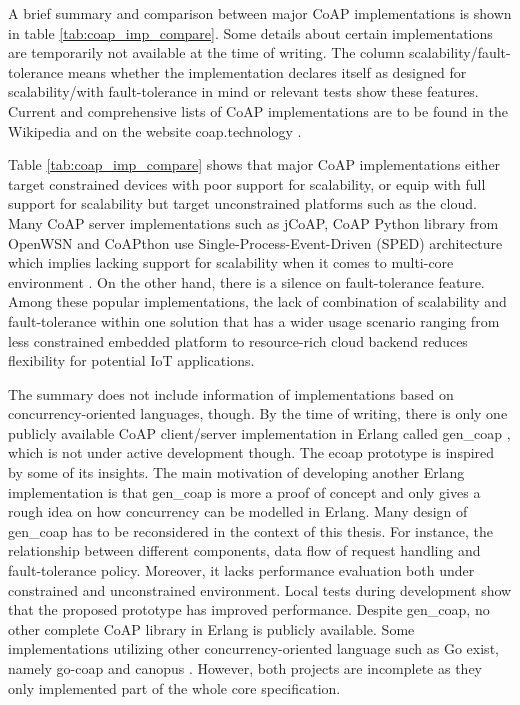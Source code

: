 A brief summary and comparison between major CoAP implementations is shown in table \ref{tab:coap_imp_compare}. Some details about certain implementations are temporarily not available at the time of writing. The column scalability/fault-tolerance means whether the implementation declares itself as designed for scalability/with fault-tolerance in mind or relevant tests show these features. Current and comprehensive lists of CoAP implementations are to be found in the Wikipedia \cite{coap_wiki} and on the website coap.technology \cite{coap_tech}.

Table \ref{tab:coap_imp_compare} shows that major CoAP implementations either target constrained devices with poor support for scalability, or equip with full support for scalability but target unconstrained platforms such as the cloud. Many CoAP server implementations such as jCoAP, CoAP Python library from OpenWSN and CoAPthon use Single-Process-Event-Driven (SPED) architecture which implies lacking support for scalability when it comes to multi-core environment \cite{kovatsch2015scalable}. On the other hand, there is a silence on fault-tolerance feature. Among these popular implementations, the lack of combination of scalability and fault-tolerance within one solution that has a wider usage scenario ranging from less constrained embedded platform to resource-rich cloud backend reduces flexibility for potential IoT applications.

The summary does not include information of implementations based on concurrency-oriented languages, though. By the time of writing, there is only one publicly available CoAP client/server implementation in Erlang called gen\_coap \cite{gen_coap}, which is not under active development though. The ecoap prototype is inspired by some of its insights. The main motivation of developing another Erlang implementation is that gen\_coap is more a proof of concept and only gives a rough idea on how concurrency can be modelled in Erlang. Many design of gen\_coap has to be reconsidered in the context of this thesis. For instance, the relationship between different components, data flow of request handling and fault-tolerance policy. Moreover, it lacks performance evaluation both under constrained and unconstrained environment. Local tests during development show that the proposed prototype has improved performance. Despite gen\_coap, no other complete CoAP library in Erlang is publicly available. Some implementations utilizing other concurrency-oriented language such as Go \cite{go} exist, namely go-coap \cite{go-coap} and canopus \cite{canopus}. However, both projects are incomplete as they only implemented part of the whole core specification. 
 
